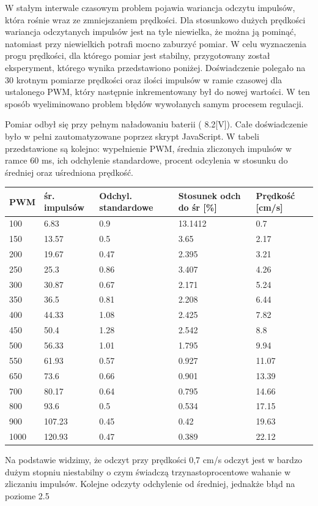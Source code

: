 \documentclass[eng,printmode]{mgr}
\begin{document}
W stałym interwale czasowym problem pojawia wariancja odczytu impulsów, która rośnie wraz ze zmniejszaniem prędkości. Dla stosunkowo dużych prędkości wariancja odczytanych impulsów jest na tyle niewielka, że można ją pominąć, natomiast przy niewielkich potrafi mocno zaburzyć pomiar. W celu wyznaczenia progu prędkości, dla którego pomiar jest stabilny, przygotowany został eksperyment, którego wynika przedstawiono poniżej. Doświadczenie polegało na 30 krotnym pomiarze prędkości oraz ilości impulsów w ramie czasowej dla ustalonego PWM, który następnie inkrementowany był do nowej wartości. W ten sposób wyeliminowano problem błędów wywołanych samym procesem regulacji. 

Pomiar odbył się przy pełnym naładowaniu baterii ( 8.2[V]). Całe doświadczenie było w pełni zautomatyzowane poprzez skrypt JavaScript. W tabeli przedstawione są kolejno: wypełnienie PWM, średnia zliczonych impulsów w ramce  60 ms, ich odchylenie standardowe, procent odcylenia w stosunku do średniej oraz uśredniona prędkość.

\begin{tabular}{ | l | l | l | l | l | }
\hline
	PWM & śr. impulsów & Odchyl. standardowe & Stosunek odch do śr [\%] & Prędkość [cm/s]  \\ \hline
	100 & 6.83 & 0.9 & 13.1412 & 0.7 \\ \hline
	150 & 13.57 & 0.5 & 3.65 & 2.17 \\ \hline
	200 & 19.67 & 0.47 & 2.395 & 3.21 \\ \hline
	250 & 25.3 & 0.86 & 3.407 & 4.26 \\ \hline
	300 & 30.87 & 0.67 & 2.171 & 5.24 \\ \hline
	350 & 36.5 & 0.81 & 2.208 & 6.44 \\ \hline
	400 & 44.33 & 1.08 & 2.425 & 7.82 \\ \hline
	450 & 50.4 & 1.28 & 2.542 & 8.8 \\ \hline
	500 & 56.33 & 1.01 & 1.795 & 9.94 \\ \hline
	550 & 61.93 & 0.57 & 0.927 & 11.07 \\ \hline
	650 & 73.6 & 0.66 & 0.901 & 13.39 \\ \hline
	700 & 80.17 & 0.64 & 0.795 & 14.66 \\ \hline
	800 & 93.6 & 0.5 & 0.534 & 17.15 \\ \hline
	900 & 107.23 & 0.45 & 0.42 & 19.63 \\ \hline
	1000 & 120.93 & 0.47 & 0.389 & 22.12 \\ \hline
\end{tabular}
Na podstawie widzimy, że odczyt przy prędkości 0,7 cm/s odczyt jest w bardzo dużym stopniu niestabilny o czym świadczą trzynastoprocentowe wahanie w zliczaniu impulsów. Kolejne odczyty odchylenie od średniej, jednakże błąd na poziome 2.5%
\end{document}
